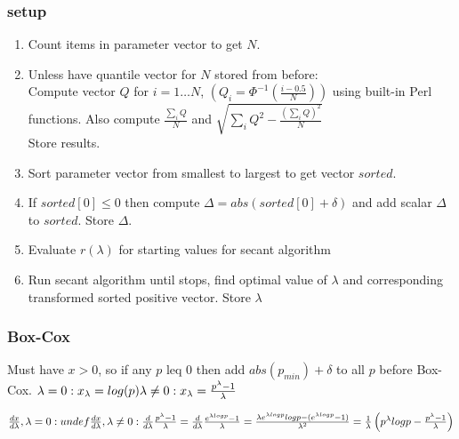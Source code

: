 \subsubsection*{setup}
\begin{enumerate}
\item Count items in parameter vector to get $N$.
\item Unless have quantile vector for $N$ stored from before:\\ Compute vector $Q$ for $i=1\ldots N$,
\begin{math}
\left(
Q_i=\Phi^{-1}\left(\frac{i-0.5}{N}\right)
\right)
\end{math}
using built-in Perl functions. Also compute $\frac{\sum_i{Q}}{N}$ and 
$\sqrt{\sum_i{Q^2}-\frac{\left(\sum_i{Q}\right)^2}{N}}$\\ Store results.
\item Sort parameter vector from smallest to largest to get vector $sorted$.
\item If $sorted[0]\leq 0$ then compute $\Delta=abs\left(sorted[0]+\delta\right)$ and add scalar $\Delta$ to $sorted$.
Store $\Delta$.
\item Evaluate $r(\lambda)$ for starting values for secant algorithm
\item Run secant algorithm until stops, find optimal value of $\lambda$ and corresponding transformed sorted positive
vector. Store $\lambda$
\end{enumerate}

\subsubsection*{Box-Cox}
Must have $x>0$, so if any $p$ leq 0 then add $abs(p_{min})+\delta$ to all $p$ before Box-Cox.
\noindent
\begin{math}
\lambda = 0: x_{\lambda}=log(p)\\
\lambda\neq 0: x_{\lambda}=\frac{p^{\lambda}-1}{\lambda}
\end{math}

\begin{math}
\frac{dx}{d\lambda}, \lambda=0: undef\\
\frac{dx}{d\lambda}, \lambda\neq 0: \frac{d}{d\lambda}\frac{p^{\lambda}-1}{\lambda}=\frac{d}{d\lambda}\frac{e^{\lambda log{p}}-1}{\lambda}=
\frac{\lambda e^{\lambda log{p}}log{p} -(e^{\lambda log{p}}-1) }{\lambda^2}=\frac{1}{\lambda}\left(p^{\lambda}log{p} - \frac{p^{\lambda}-1}{\lambda}\right)
\end{math}

